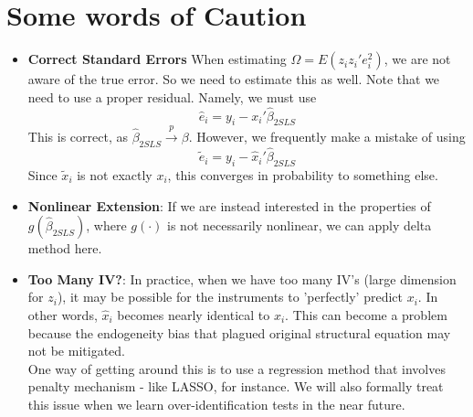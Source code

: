 \section{Some words of Caution}
\begin{itemize}
\item \textbf{Correct Standard Errors} When estimating $\Omega=E(z_iz_i'e_i^2)$, we are not aware of the true error. So we need to estimate this as well. Note that we need to use a proper residual. Namely, we must use
\[
\hat{e}_i = y_i - x_i'\hat{\beta}_{2SLS}
\]
This is correct, as $\hat{\beta}_{2SLS}\xrightarrow{p}\beta$. However, we frequently make a mistake of using
\[
\tilde{e}_i = y_i - \hat{x}_i'\hat{\beta}_{2SLS}
\]
Since $\tilde{x}_i$ is not exactly $x_i$, this converges in probability to something else. 
\begin{mdframed}[backgroundcolor=yellow!5] 
\begin{comment}[on STATA]
To see this, compare the standard errors from doing \textnormal{\texttt{ivregress 2sls y (x=z)}} and 'hard-coding' 2SLS by using \textnormal{\texttt{reg x z}}, then \textnormal{\texttt{predict xhat}}, and then coding \textnormal{\texttt{reg y xhat}}. 
\end{comment}
\end{mdframed}
\item \textbf{Nonlinear Extension}: If we are instead interested in the properties of $g(\hat{\beta}_{2SLS})$, where $g(\cdot)$ is not necessarily nonlinear, we can apply delta method here. 
\item \textbf{Too Many IV?}: In practice, when we have too many IV's (large dimension for $z_i$), it may be possible for the instruments to 'perfectly' predict $x_i$. In other words, $\hat{x}_i$ becomes nearly identical to $x_i$. This can become a problem because the endogeneity bias that plagued original structural equation may not be mitigated. \\
One way of getting around this is to use a regression method that involves penalty mechanism - like LASSO, for instance. We will also formally treat this issue when we learn over-identification tests in the near future. 
\end{itemize}

